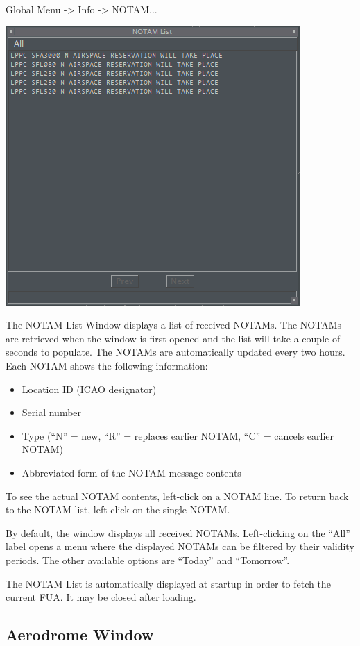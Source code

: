 \documentclass[11pt,a4paper]{memoir}
\begin{document}
Global Menu -> Info -> NOTAM...

\includegraphics{img/notamlist.png}

The NOTAM List Window displays a list of received NOTAMs. The NOTAMs are retrieved when the window is first opened and the list will take a couple of seconds to populate. The NOTAMs are automatically updated every two hours. Each NOTAM shows the following information:

\begin{itemize}
    \item Location ID (ICAO designator)
    \item Serial number
    \item Type (“N” = new, “R” = replaces earlier NOTAM, “C” = cancels earlier NOTAM)
    \item Abbreviated form of the NOTAM message contents
\end{itemize}

To see the actual NOTAM contents, left-click on a NOTAM line. To return back to the NOTAM list, left-click on the single NOTAM.

By default, the window displays all received NOTAMs. Left-clicking on the “All” label opens a menu where the displayed NOTAMs can be filtered by their validity periods. The other available options are “Today” and “Tomorrow”.

The NOTAM List is automatically displayed at startup in order to fetch the current FUA. It may be closed after loading.

\subsection{Aerodrome Window}
\label{win:adw}
\end{document}
